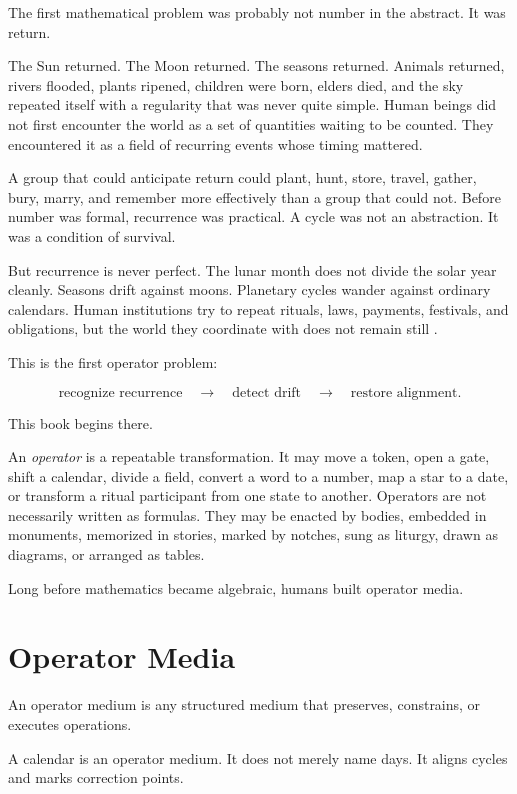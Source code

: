 \documentclass[11pt]{book}
\begin{document}
The first mathematical problem was probably not number in the abstract. It was return.

The Sun returned. The Moon returned. The seasons returned. Animals returned, rivers flooded, plants ripened, children were born, elders died, and the sky repeated itself with a regularity that was never quite simple. Human beings did not first encounter the world as a set of quantities waiting to be counted. They encountered it as a field of recurring events whose timing mattered.

A group that could anticipate return could plant, hunt, store, travel, gather, bury, marry, and remember more effectively than a group that could not. Before number was formal, recurrence was practical. A cycle was not an abstraction. It was a condition of survival.

But recurrence is never perfect. The lunar month does not divide the solar year cleanly. Seasons drift against moons. Planetary cycles wander against ordinary calendars. Human institutions try to repeat rituals, laws, payments, festivals, and obligations, but the world they coordinate with does not remain still \cite{Neugebauer1957ExactSciences,Aveni1989EmpiresTime,Clagett1995AncientEgyptianScience2}.

This is the first operator problem:

\[
\text{recognize recurrence} \quad \rightarrow \quad
\text{detect drift} \quad \rightarrow \quad
\text{restore alignment}.
\]

This book begins there.

An \emph{operator} is a repeatable transformation. It may move a token, open a gate, shift a calendar, divide a field, convert a word to a number, map a star to a date, or transform a ritual participant from one state to another. Operators are not necessarily written as formulas. They may be enacted by bodies, embedded in monuments, memorized in stories, marked by notches, sung as liturgy, drawn as diagrams, or arranged as tables.

Long before mathematics became algebraic, humans built operator media.

\section{Operator Media}

An operator medium is any structured medium that preserves, constrains, or executes operations.

A calendar is an operator medium. It does not merely name days. It aligns cycles and marks correction points.
\end{document}

